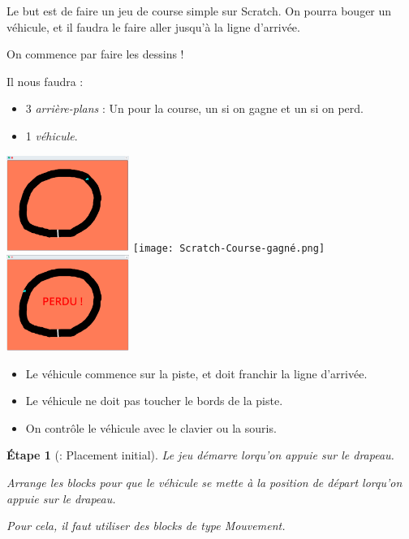 \documentclass[a4paper,11pt]{article}
\theoremstyle{etape_style}
\newtheorem{etape}{Étape}
\begin{document}
\maketitle

Le but est de faire un jeu de course simple sur Scratch. On pourra bouger un véhicule, et il faudra le faire aller jusqu'à la ligne d'arrivée.

\begin{greybox}[frametitle={Dessins}]
	On commence par faire les dessins !

	Il nous faudra :
	\begin{itemize}
		\item 3 \textit{arrière-plans} : Un pour la course, un si on gagne et un si on perd.
		\item 1 \textit{véhicule}.
	\end{itemize}
\end{greybox}

\begin{center}
	\includegraphics[width=0.3\textwidth]{Scratch-Course.png}
	\texttt{[image: Scratch-Course-gagné.png]}
	\includegraphics[width=0.3\textwidth]{Scratch-Course-perdu.png}
\end{center}

\begin{regles}
	\begin{itemize}
		\item Le véhicule commence sur la piste, et doit franchir la ligne d'arrivée.
		\item Le véhicule ne doit pas toucher le bords de la piste.
		\item On contrôle le véhicule avec le clavier ou la souris.
	\end{itemize}
\end{regles}

\begin{etape}[: Placement initial]
	Le jeu démarre lorqu'on appuie sur le drapeau.

	Arrange les blocks pour que le véhicule se mette à la position de départ lorqu'on appuie sur le drapeau.

	Pour cela, il faut utiliser des blocks de type \textit{Mouvement}.
\end{etape}
\end{document}
